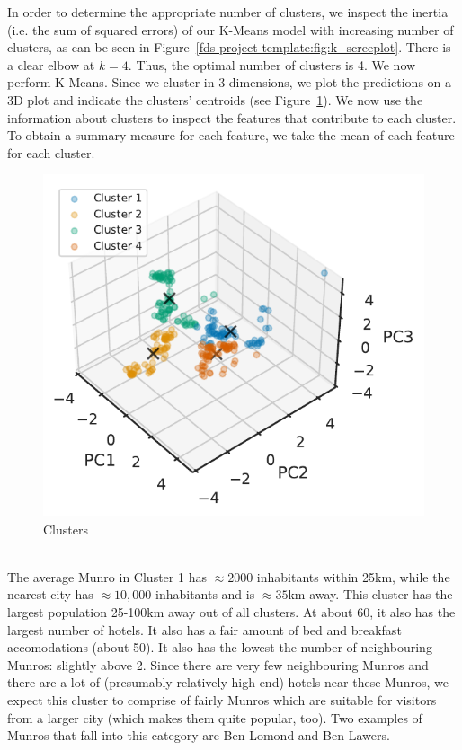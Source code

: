 \documentclass[11pt,a4paper]{article}
\begin{document}
In order to determine the appropriate number of clusters, we inspect the inertia (i.e. the sum of squared errors) of our K-Means model with increasing number of clusters, as can be seen in Figure~\ref{fds-project-template:fig:k_screeplot}. There is a clear elbow at $k = 4$. Thus, the optimal number of clusters is 4. We now perform K-Means. Since we cluster in 3 dimensions, we plot the predictions on a 3D plot and indicate the clusters' centroids (see Figure~\ref{fds-project-template:fig:3d_clusters}). We now use the information about clusters to inspect the features that contribute to each cluster. To obtain a summary measure for each feature, we take the mean of each feature for each cluster. \\
\begin{figure} [h!]
  \centering
  \includegraphics{report/3d_clusters.pdf}
  \caption{Clusters}
  \label{fds-project-template:fig:3d_clusters}
\end{figure} \\
The average Munro in Cluster 1 has $\approx 2000$ inhabitants within 25km, while the nearest city has $\approx 10,000$ inhabitants and is $\approx 35$km away. This cluster has the largest population 25-100km away out of all clusters. At about 60, it also has the largest number of hotels. It also has a fair amount of bed and breakfast accomodations (about 50). It also has the lowest the number of neighbouring Munros: slightly above 2. Since there are very few neighbouring Munros and there are a lot of (presumably relatively high-end) hotels near these Munros, we expect this cluster to comprise of fairly  Munros which are suitable for visitors from a larger city (which makes them quite popular, too). Two examples of Munros that fall into this category are Ben Lomond and Ben Lawers.\\ \\
\end{document}
